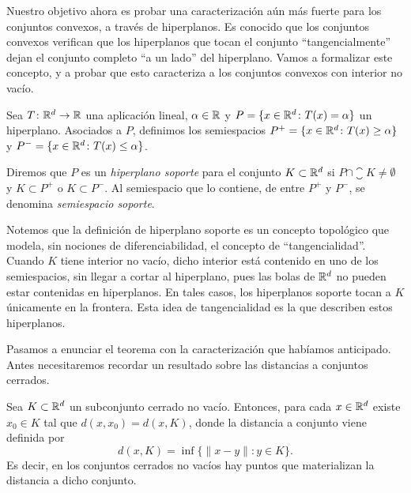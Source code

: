 \documentclass{book}
\begin{document}
Nuestro objetivo ahora es probar una caracterización aún más fuerte para los conjuntos convexos, a través de hiperplanos. Es conocido que los conjuntos convexos verifican que los hiperplanos que tocan el conjunto ``tangencialmente'' dejan el conjunto completo ``a un lado'' del hiperplano. Vamos a formalizar este concepto, y a probar que esto caracteriza a los conjuntos convexos con interior no vacío.

\begin{definition}
	Sea $T \colon \mathbb{R}^d \to \mathbb{R}$ una aplicación lineal, $\alpha \in\mathbb{R}$ y $P = \{x \in \mathbb{R}^d \colon T(x) = \alpha \}$ un hiperplano. Asociados a $P$, definimos los semiespacios $P^+ = \{x \in \mathbb{R}^d \colon T(x) \ge \alpha \}$ y $P^- = \{x \in \mathbb{R}^d \colon T(x) \le \alpha \}$.

	Diremos que $P$ es un \emph{hiperplano soporte} para el conjunto $K \subset \mathbb{R}^d$ si $P \cap \closure{K} \ne \emptyset$ y $K \subset P^+$ o $K \subset P^-$. Al semiespacio que lo contiene, de entre $P^+$ y $P^-$, se denomina \emph{semiespacio soporte}.
\end{definition}

Notemos que la definición de hiperplano soporte es un concepto topológico que modela, sin nociones de diferenciabilidad, el concepto de ``tangencialidad''. Cuando $K$ tiene interior no vacío, dicho interior está contenido en uno de los semiespacios, sin llegar a cortar al hiperplano, pues las bolas de $\mathbb{R}^d$ no pueden estar contenidas en hiperplanos. En tales casos, los hiperplanos soporte tocan a $K$ únicamente en la frontera. Esta idea de tangencialidad es la que describen estos hiperplanos.

Pasamos a enunciar el teorema con la caracterización que habíamos anticipado. Antes necesitaremos recordar un resultado sobre las distancias a conjuntos cerrados.



\begin{prop} \label{prop:mat_dist}
	Sea $K \subset \mathbb{R}^d$ un subconjunto cerrado no vacío. Entonces, para cada $x \in \mathbb{R}^d$ existe $x_0 \in K$ tal que $d(x,x_0) = d(x,K)$, donde la distancia a conjunto viene definida por
	\[ d(x,K) = \inf\{\|x-y\| \colon y \in K \}. \]
	Es decir, en los conjuntos cerrados no vacíos hay puntos que materializan la distancia a dicho conjunto.
\end{prop}
\end{document}
